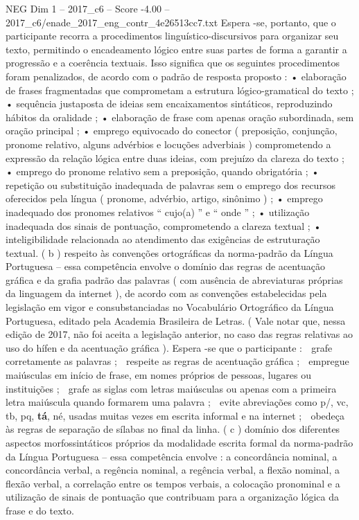 \begin{textsample}{NEG Dim 1 – 2017\_c6 – Score -4.00 – 2017\_c6/enade\_2017\_eng\_contr\_4e26513cc7.txt}
Espera -se, portanto, que o participante recorra a procedimentos linguístico-discursivos para organizar seu texto, permitindo o encadeamento lógico entre suas partes de forma a garantir a progressão e a coerência textuais.
Isso significa que os seguintes procedimentos foram penalizados, de acordo com o padrão de resposta proposto : • elaboração de frases fragmentadas que comprometam a estrutura lógico-gramatical do texto ; • sequência justaposta de ideias sem encaixamentos sintáticos, reproduzindo hábitos da oralidade ; • elaboração de frase com apenas oração subordinada, sem oração principal ; • emprego equivocado do conector ( preposição, conjunção, pronome relativo, alguns advérbios e locuções adverbiais ) comprometendo a expressão da relação lógica entre duas ideias, com prejuízo da clareza do texto ; • emprego do pronome relativo sem a preposição, quando obrigatória ; • repetição ou substituição inadequada de palavras sem o emprego dos recursos oferecidos pela língua ( pronome, advérbio, artigo, sinônimo ) ; • emprego inadequado dos pronomes relativos “ cujo(a) ” e “ onde ” ; • utilização inadequada dos sinais de pontuação, comprometendo a clareza textual ; • inteligibilidade relacionada ao atendimento das exigências de estruturação textual. ( b ) respeito às convenções ortográficas da norma-padrão da Língua Portuguesa – essa competência envolve o domínio das regras de acentuação gráfica e da grafia padrão das palavras ( com ausência de abreviaturas próprias da linguagem da internet ), de acordo com as convenções estabelecidas pela legislação em vigor e consubstanciadas no Vocabulário Ortográfico da Língua Portuguesa, editado pela Academia Brasileira de Letras. ( Vale notar que, nessa edição de 2017, não foi aceita a legislação anterior, no caso das regras relativas ao uso do hífen e da acentuação gráfica ).
Espera -se que o participante :  grafe corretamente as palavras ;  respeite as regras de acentuação gráfica ;  empregue maiúsculas em início de frase, em nomes próprios de pessoas, lugares ou instituições ;  grafe as siglas com letras maiúsculas ou apenas com a primeira letra maiúscula quando formarem uma palavra ;  evite abreviações como p/, vc, tb, pq, \textbf{tá}, né, usadas muitas vezes em escrita informal e na internet ;  obedeça às regras de separação de sílabas no final da linha. ( c ) domínio dos diferentes aspectos morfossintáticos próprios da modalidade escrita formal da norma-padrão da Língua Portuguesa – essa competência envolve : a concordância nominal, a concordância verbal, a regência nominal, a regência verbal, a flexão nominal, a flexão verbal, a correlação entre os tempos verbais, a colocação pronominal e a utilização de sinais de pontuação que contribuam para a organização lógica da frase e do texto.

\end{textsample}
